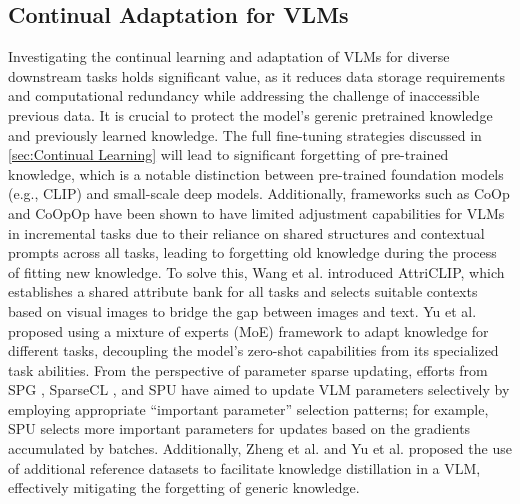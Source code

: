 \subsection{Continual Adaptation for VLMs}

Investigating the continual learning and adaptation of VLMs for diverse downstream tasks holds significant value, as it reduces data storage requirements and computational redundancy while addressing the challenge of inaccessible previous data. It is crucial to protect the model's gerenic pretrained knowledge and previously learned knowledge. The full fine-tuning strategies discussed in \ref{sec:Continual Learning} will lead to significant forgetting of pre-trained knowledge, which is a notable distinction between pre-trained foundation models (e.g., CLIP) and small-scale deep models. Additionally, frameworks such as CoOp \cite{zhou2022learning} and CoOpOp \cite{zhou2022conditional} have been shown to have limited adjustment capabilities for VLMs in incremental tasks due to their reliance on shared structures and contextual prompts across all tasks, leading to forgetting old knowledge during the process of fitting new knowledge. To solve this, Wang et al. \cite{wang2023attriclip} introduced AttriCLIP, which establishes a shared attribute bank for all tasks and selects suitable contexts based on visual images to bridge the gap between images and text. Yu et al. \cite{yu2024boosting} proposed using a mixture of experts (MoE) framework to adapt knowledge for different tasks, decoupling the model's zero-shot capabilities from its specialized task abilities. From the perspective of parameter sparse updating, efforts from SPG \cite{konishi2023parameter}, SparseCL \cite{wang2022sparcl}, and SPU \cite{zhang2024overcoming} have aimed to update VLM parameters selectively by employing appropriate “important parameter” selection patterns; for example, SPU selects more important parameters for updates based on the gradients accumulated by batches. Additionally, Zheng et al. \cite{zheng2023preventing} and Yu et al. \cite{yu2025select} proposed the use of additional reference datasets to facilitate knowledge distillation in a VLM, effectively mitigating the forgetting of generic knowledge.